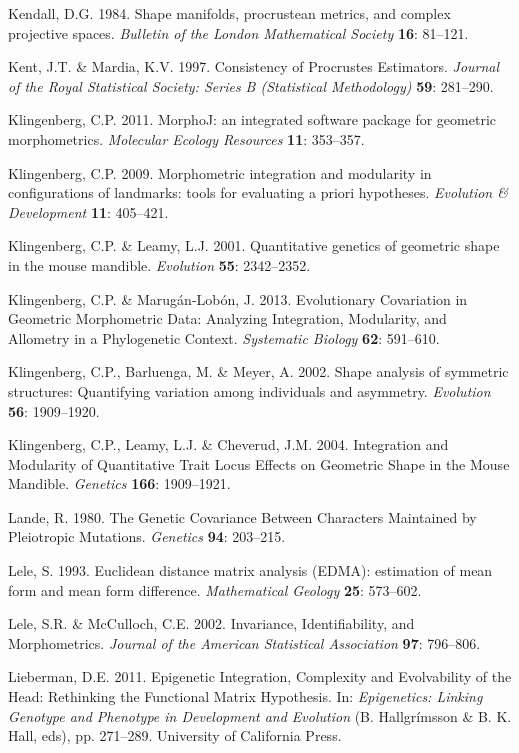 \documentclass[12pt,]{article}
\begin{document}
Kendall, D.G. 1984. Shape manifolds, procrustean metrics, and complex
projective spaces. \emph{Bulletin of the London Mathematical Society}
\textbf{16}: 81--121.

Kent, J.T. \& Mardia, K.V. 1997. Consistency of Procrustes Estimators.
\emph{Journal of the Royal Statistical Society: Series B (Statistical
Methodology)} \textbf{59}: 281--290.

Klingenberg, C.P. 2011. MorphoJ: an integrated software package for
geometric morphometrics. \emph{Molecular Ecology Resources} \textbf{11}:
353--357.

Klingenberg, C.P. 2009. Morphometric integration and modularity in
configurations of landmarks: tools for evaluating a priori hypotheses.
\emph{Evolution \& Development} \textbf{11}: 405--421.

Klingenberg, C.P. \& Leamy, L.J. 2001. Quantitative genetics of
geometric shape in the mouse mandible. \emph{Evolution} \textbf{55}:
2342--2352.

Klingenberg, C.P. \& Marugán-Lobón, J. 2013. Evolutionary Covariation in
Geometric Morphometric Data: Analyzing Integration, Modularity, and
Allometry in a Phylogenetic Context. \emph{Systematic Biology}
\textbf{62}: 591--610.

Klingenberg, C.P., Barluenga, M. \& Meyer, A. 2002. Shape analysis of
symmetric structures: Quantifying variation among individuals and
asymmetry. \emph{Evolution} \textbf{56}: 1909--1920.

Klingenberg, C.P., Leamy, L.J. \& Cheverud, J.M. 2004. Integration and
Modularity of Quantitative Trait Locus Effects on Geometric Shape in the
Mouse Mandible. \emph{Genetics} \textbf{166}: 1909--1921.

Lande, R. 1980. The Genetic Covariance Between Characters Maintained by
Pleiotropic Mutations. \emph{Genetics} \textbf{94}: 203--215.

Lele, S. 1993. Euclidean distance matrix analysis (EDMA): estimation of
mean form and mean form difference. \emph{Mathematical Geology}
\textbf{25}: 573--602.

Lele, S.R. \& McCulloch, C.E. 2002. Invariance, Identifiability, and
Morphometrics. \emph{Journal of the American Statistical Association}
\textbf{97}: 796--806.

Lieberman, D.E. 2011. Epigenetic Integration, Complexity and
Evolvability of the Head: Rethinking the Functional Matrix Hypothesis.
In: \emph{Epigenetics: Linking Genotype and Phenotype in Development and
Evolution} (B. Hallgrímsson \& B. K. Hall, eds), pp. 271--289.
University of California Press.
\end{document}
